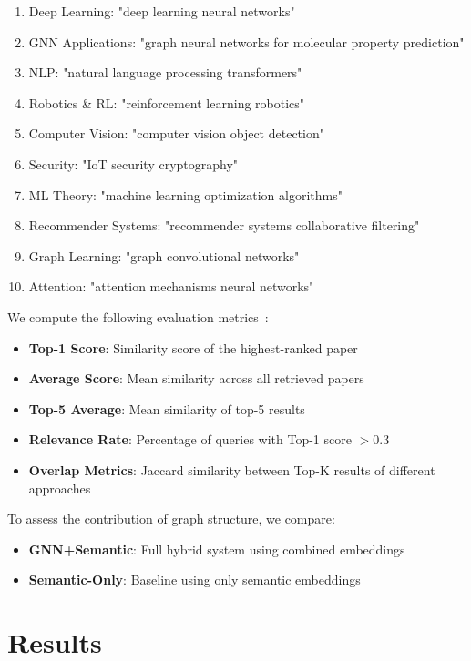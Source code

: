 \documentclass[pdflatex,sn-mathphys-num]{sn-jnl}
\theoremstyle{thmstyleone}%
\theoremstyle{thmstyletwo}%
\theoremstyle{thmstylethree}%
\begin{document}
\begin{enumerate}
    \item Deep Learning: "deep learning neural networks"
    \item GNN Applications: "graph neural networks for molecular property prediction"
    \item NLP: "natural language processing transformers"
    \item Robotics \& RL: "reinforcement learning robotics"
    \item Computer Vision: "computer vision object detection"
    \item Security: "IoT security cryptography"
    \item ML Theory: "machine learning optimization algorithms"
    \item Recommender Systems: "recommender systems collaborative filtering"
    \item Graph Learning: "graph convolutional networks"
    \item Attention: "attention mechanisms neural networks"
\end{enumerate}

We compute the following evaluation metrics~\cite{manning2008introduction}:

\begin{itemize}
    \item \textbf{Top-1 Score}: Similarity score of the highest-ranked paper
    \item \textbf{Average Score}: Mean similarity across all retrieved papers
    \item \textbf{Top-5 Average}: Mean similarity of top-5 results
    \item \textbf{Relevance Rate}: Percentage of queries with Top-1 score $> 0.3$
    \item \textbf{Overlap Metrics}: Jaccard similarity between Top-K results of different approaches
\end{itemize}

To assess the contribution of graph structure, we compare:

\begin{itemize}
    \item \textbf{GNN+Semantic}: Full hybrid system using combined embeddings
    \item \textbf{Semantic-Only}: Baseline using only semantic embeddings
\end{itemize}

\section{Results}\label{sec:results}
\end{document}

